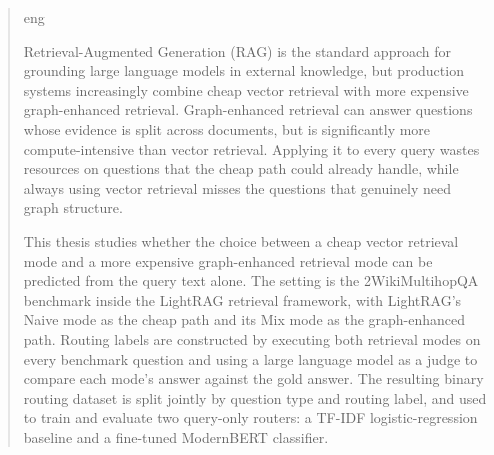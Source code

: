 \documentclass[english, bibtex]{kththesis}               %
\newcommand*{\generalExpl}[1]{\todo[inline]{#1}}
\newcommand*{\engExpl}[1]{\todo[inline, backgroundcolor=kth-lightgreen40]{#1}} %
\renewcommand\generalExpl[1]{}
\renewcommand\engExpl[1]{}
\numberwithin{listing}{chapter}
\begin{document}
\begin{abstract}
  \markboth{\abstractname}{}
\begin{scontents}[store-env=lang]
eng
\end{scontents}
\engExpl{All theses at KTH are \textbf{required} to have an abstract in both \textit{English} and \textit{Swedish}.}

\engExpl{Exchange students may want to include one or more abstracts in the language(s) used in their home institutions to avoid the need to write another thesis when returning to their home institution.}

\generalExpl{Keep in mind that most of your potential readers are only going to read your \texttt{title} and \texttt{abstract}. This is why the abstract must give them enough information so that they can decide if this document is relevant to them or not. Otherwise, the likely default choice is to ignore the rest of your document.\\
An abstract should stand on its own, \ie no citations, cross-references to the body of the document, acronyms must be spelled out, \ldots .\\Write this early and revise as necessary. This will help keep you focused on what you are trying to do.}

\begin{scontents}[store-env=abstracts,print-env=true]
Retrieval-Augmented Generation (RAG) is the standard approach for grounding large language models in external knowledge, but production systems increasingly combine cheap vector retrieval with more expensive graph-enhanced retrieval. Graph-enhanced retrieval can answer questions whose evidence is split across documents, but is significantly more compute-intensive than vector retrieval. Applying it to every query wastes resources on questions that the cheap path could already handle, while always using vector retrieval misses the questions that genuinely need graph structure.

This thesis studies whether the choice between a cheap vector retrieval mode and a more expensive graph-enhanced retrieval mode can be predicted from the query text alone. The setting is the 2WikiMultihopQA benchmark inside the LightRAG retrieval framework, with LightRAG's Naive mode as the cheap path and its Mix mode as the graph-enhanced path. Routing labels are constructed by executing both retrieval modes on every benchmark question and using a large language model as a judge to compare each mode's answer against the gold answer. The resulting binary routing dataset is split jointly by question type and routing label, and used to train and evaluate two query-only routers: a TF-IDF logistic-regression baseline and a fine-tuned ModernBERT classifier.


\end{scontents}
\end{abstract}
\end{document}
